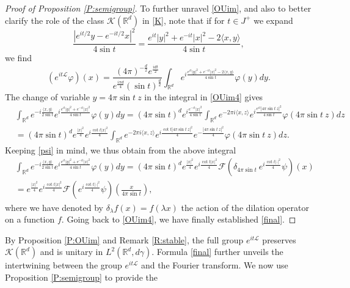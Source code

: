 \documentclass[11pt,a4paper]{amsart}
\def \vf{\varphi}
\newcommand{\Rm}{\mathbb R^d}
\newcommand{\la}{\lambda}
\numberwithin{equation}{section}
\newcommand{\sa}{\langle}
\newcommand{\da}{\rangle}
\numberwithin{equation}{section}
\begin{document}
\begin{proof}[Proof of Proposition \ref{P:semigroup}]
To further unravel \eqref{OUim}, and also to better clarify the role of the class $\mathscr K(\Rm)$ in \eqref{K}, note that if for $t\in J^+$ we expand
\begin{equation}\label{expa}
\frac{|e^{it/2}y-e^{-it/2} x|^2}{4 \sin t} = \frac{e^{it}|y|^2 + e^{-it}|x|^2 - 2\sa x,y\da}{4 \sin t},
\end{equation}
we find 
\begin{equation}\label{OUim4}
\left(e^{it\mathscr L}\vf\right)(x) = \frac{(4\pi
)^{-\frac{d}{2}}e^{\frac{idt}2}}{e^{\frac{i\pi d}{4}} (\sin t)^{\frac d2}} \int_{\Rm} e^{i \frac{e^{it}|y|^2 + e^{-it}|x|^2 - 2\sa x,y\da}{4 \sin t}} \vf(y) dy.
\end{equation}
The change of variable $y = 4 \pi \sin t\ z$ in the integral in \eqref{OUim4} gives
\begin{align*}
& \int_{\Rm} e^{- i \frac{\sa x,y\da}{2 \sin t}} e^{i \frac{e^{it}|y|^2 + e^{-it}|x|^2}{4 \sin t}} \vf(y) dy = (4 \pi \sin t)^d e^{i \frac{e^{-it}|x|^2}{4 \sin t}} \int_{\Rm} e^{- 2 \pi i \sa x,z\da} e^{i \frac{e^{it}  |4 \pi \sin t\ z|^2}{4 \sin t}} \vf(4 \pi \sin t\ z) dz
\\
& = (4 \pi \sin t)^d e^{\frac{|x|^2}{4}} e^{i \frac{\cot t |x|^2}{4}} \int_{\Rm} e^{- 2 \pi i \sa x,z\da} e^{i \frac{\cot t |4 \pi \sin t\ z|^2}{4}} e^{- \frac{|4 \pi \sin t\ z|^2}{4}} \vf(4 \pi \sin t\ z) dz.
\end{align*}
Keeping \eqref{psi} in mind, 
we thus obtain from the above integral  
\begin{align*}
& \int_{\Rm} e^{- i \frac{\sa x,y\da}{2 \sin t}} e^{i \frac{e^{it}|y|^2 + e^{-it}|x|^2}{4 \sin t}} \vf(y) dy = (4 \pi \sin t)^d e^{\frac{|x|^2}{4}} e^{i \frac{\cot t |x|^2}{4}} \mathscr F\left(\delta_{4 \pi \sin t}\ e^{i \frac{\cot t |\cdot|^2}4} \psi\right)(x)
\\
& = e^{\frac{|x|^2}{4}} e^{i \frac{\cot t |x|^2}{4}} \mathscr F\left(e^{i \frac{\cot t |\cdot|^2}4} \psi\right)(\frac{x}{4 \pi \sin t}),
\end{align*}
where we have denoted by $\delta_\la f(x) = f(\la x)$ the action of the dilation operator on a function $f$.
Going back to \eqref{OUim4}, we have finally established \eqref{final}.

\end{proof}


By Proposition \ref{P:OUim} and Remark \ref{R:stable}, the full group
$e^{it\mathscr L}$ preserves $\mathscr K(\Rm)$ and is unitary in
$L^2(\Rm,d\gamma)$. Formula \eqref{final} further unveils the
intertwining between the group $e^{it\mathscr L}$ and the Fourier
transform. 
We now use Proposition \ref{P:semigroup} to provide the 
\end{document}
